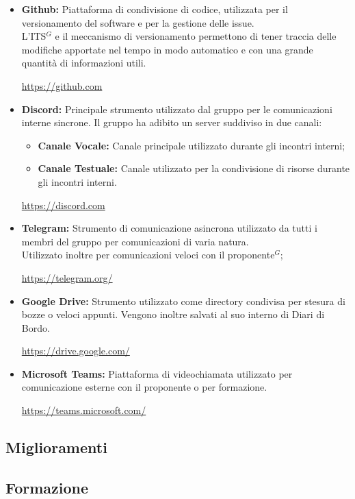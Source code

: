         \begin{itemize}
            \item \textbf{Github:} Piattaforma di condivisione di codice, utilizzata per il versionamento del software e per la gestione delle issue.\\
            L'ITS$^{G}$ e il meccanismo di versionamento permettono di tener traccia delle modifiche apportate nel tempo in modo automatico e con una grande quantità di informazioni utili.
            \begin{center}
                \url{https://github.com}
            \end{center}
            \item \textbf{Discord:} Principale strumento utilizzato dal gruppo per le comunicazioni interne sincrone. 
                Il gruppo ha adibito un server suddiviso in due canali:
                \begin{itemize}
                    \item \textbf{Canale Vocale:} Canale principale utilizzato durante gli incontri interni;
                    \item \textbf{Canale Testuale:} Canale utilizzato per la condivisione di risorse durante gli incontri interni.
                \end{itemize}
                \begin{center}
                    \url{https://discord.com}
                \end{center}
            \item \textbf{Telegram:} Strumento di comunicazione asincrona utilizzato da tutti i membri del gruppo per comunicazioni di varia natura.\\
                    Utilizzato inoltre per comunicazioni veloci con il proponente$^{G}$;
                    \begin{center}
                        \url{https://telegram.org/}
                    \end{center}
            \item \textbf{Google Drive:} Strumento utilizzato come directory condivisa per stesura di bozze o veloci appunti.
            Vengono inoltre salvati al suo interno di Diari di Bordo.
                \begin{center}
                    \url{https://drive.google.com/}
                \end{center}
           \item \textbf{Microsoft Teams:} Piattaforma di videochiamata utilizzato per comunicazione esterne con il proponente o per formazione.
           \begin{center}
            \url{https://teams.microsoft.com/}
           \end{center}
        \end{itemize}
        
        \subsection{Miglioramenti}

        \subsection{Formazione}
        